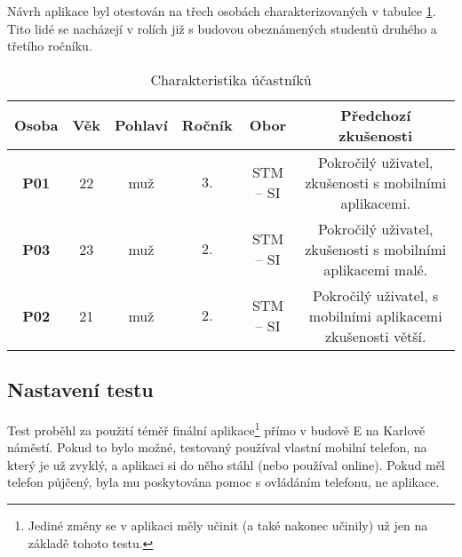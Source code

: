 Návrh aplikace byl otestován na třech osobách charakterizovaných v tabulce \ref{tab:charakteristikaUcastniku2}. Tito lidé se nacházejí v rolích již s budovou obeznámených studentů druhého a třetího ročníku.
\begin{table}
\begin{center}
\begin{threeparttable}
\begin{tabular}{|c|c|c|c|c|c|}
\hline
\textbf{Osoba} & \textbf{Věk} & \textbf{Pohlaví} & \textbf{Ročník} & \textbf{Obor} & \textbf{Předchozí zkušenosti} \\
\hline
\textbf{P01} & 22 & muž & $3.$ & STM -- SI & \parbox{2.5in}{\vspace{3pt} Pokročilý uživatel, zkušenosti s mobilními aplikacemi.\vspace{3pt}} \\
\textbf{P03} & 23 & muž & $2.$ & STM -- SI & \parbox{2.5in}{\vspace{3pt} Pokročilý uživatel, zkušenosti s mobilními aplikacemi malé.\vspace{3pt}} \\
\textbf{P02} & 21 & muž & $2.$ & STM -- SI & \parbox{2.5in}{\vspace{3pt} Pokročilý uživatel, s mobilními aplikacemi zkušenosti větší.\vspace{3pt}} \\
\hline
\end{tabular}
\caption{Charakteristika účastníků}
\label{tab:charakteristikaUcastniku2}
\end{threeparttable}
\end{center}
\end{table}

\subsection{Nastavení testu}
Test proběhl za použití téměř finální aplikace\footnote{Jediné změny se v aplikaci měly učinit (a také nakonec učinily) už jen na základě tohoto testu.} přímo v budově E na Karlově náměstí. Pokud to bylo možné, testovaný používal vlastní mobilní telefon, na který je už zvyklý, a aplikaci si do něho stáhl (nebo používal online). Pokud měl telefon půjčený, byla mu poskytována pomoc s ovládáním telefonu, ne aplikace.


